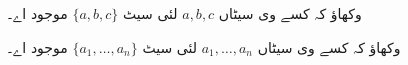 \documentclass[../../../include/open-logic-section]{subfiles}
\begin{document}
\begin{prob}
وکھاؤ کہ کسے وی سیٹاں $a, b, c$ لئی سیٹ $\{a, b, c\}$ موجود اے۔
\end{prob}

\begin{prob}
وکھاؤ کہ کسے وی سیٹاں $a_1, \ldots, a_n$ لئی سیٹ $\{a_1, \ldots, a_n\}$
موجود اے۔
\end{prob}

\end{document}
